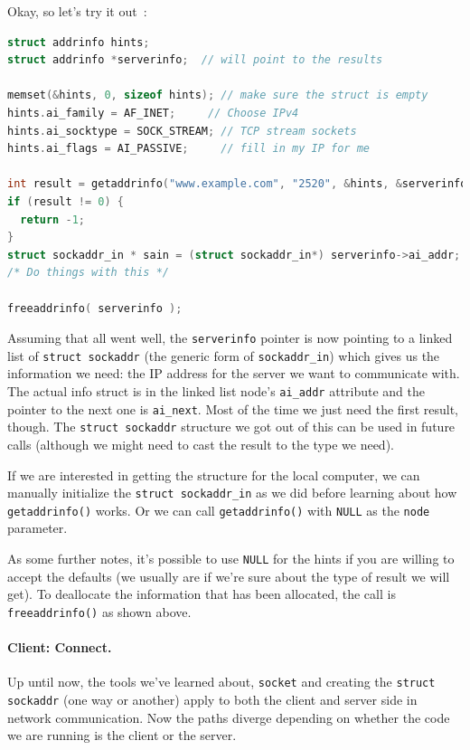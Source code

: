 \documentclass[a4paper]{report}
\begin{document}
Okay, so let's try it out~\cite{getaddrinfo}:

\begin{lstlisting}[language=C]
struct addrinfo hints;
struct addrinfo *serverinfo;  // will point to the results

memset(&hints, 0, sizeof hints); // make sure the struct is empty
hints.ai_family = AF_INET;     // Choose IPv4
hints.ai_socktype = SOCK_STREAM; // TCP stream sockets
hints.ai_flags = AI_PASSIVE;     // fill in my IP for me

int result = getaddrinfo("www.example.com", "2520", &hints, &serverinfo);
if (result != 0) {
  return -1;
}
struct sockaddr_in * sain = (struct sockaddr_in*) serverinfo->ai_addr;
/* Do things with this */

freeaddrinfo( serverinfo );
\end{lstlisting}

Assuming that all went well, the \texttt{serverinfo} pointer is now pointing to a linked list of \texttt{struct sockaddr} (the generic form of \texttt{sockaddr\_in}) which gives us the information we need: the IP address for the server we want to communicate with. The actual info struct is in the linked list node's \texttt{ai\_addr} attribute and the pointer to the next one is \texttt{ai\_next}. Most of the time we just need the first result, though. The \texttt{struct sockaddr} structure we got out of this can be used in future calls (although we might need to cast the result to the type we need).

If we are interested in getting the structure for the local computer, we can manually initialize the \texttt{struct sockaddr\_in} as we did before learning about how \texttt{getaddrinfo()} works. Or we can call \texttt{getaddrinfo()} with \texttt{NULL} as the \texttt{node} parameter.

As some further notes, it's possible to use \texttt{NULL} for the hints if you are willing to accept the defaults (we usually are if we're sure about the type of result we will get). To deallocate the information that has been allocated, the call is \texttt{freeaddrinfo()} as shown above.

\paragraph{Client: Connect.}
Up until now, the tools we've learned about, \texttt{socket} and creating the \texttt{struct sockaddr} (one way or another) apply to both the client and server side in network communication. Now the paths diverge depending on whether the code we are running is the client or the server.
\end{document}
